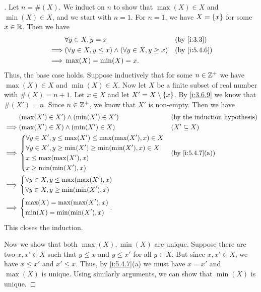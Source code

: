 \begin{proof}[]
  Let \(n = \#(X)\).
  We induct on \(n\) to show that \(\max(X) \in X\) and \(\min(X) \in X\), and we start with \(n = 1\).
  For \(n = 1\), we have \(X = \left\lbrace x\right\rbrace\) for some \(x \in \mathbb{R}\).
  Then we have
  \begin{align*}
             & \forall y \in X, y = x                                        &  & \by{i:3.3}   \\
    \implies & (\forall y \in X, y \leq x) \land (\forall y \in X, y \geq x) &  & \by{i:5.4.6} \\
    \implies & \max(X) = \min(X) = x.
  \end{align*}
  Thus, the base case holds.
  Suppose inductively that for some \(n \in \mathbb{Z}^+\) we have \(\max(X) \in X\) and \(\min(X) \in X\).
  Now let \(X\) be a finite subset of real number with \(\#(X) = n + 1\).
  Let \(x \in X\) and let \(X' = X \setminus \left\lbrace x\right\rbrace\).
  By \cref{i:3.6.9} we know that \(\#(X') = n\).
  Since \(n \in \mathbb{Z}^+\), we know that \(X'\) is non-empty.
  Then we have
  \begin{align*}
             & (\max(X') \in X') \land (\min(X') \in X')                         &  & \byIH            \\
    \implies & (\max(X') \in X) \land (\min(X') \in X)                           &  & (X' \subseteq X) \\
    \implies & \begin{dcases}
                 \forall y \in X', y \leq \max(X') \leq \max(\max(X'), x) \in X \\
                 \forall y \in X', y \geq \min(X') \geq \min(\min(X'), x) \in X \\
                 x \leq \max(\max(X'), x)                                       \\
                 x \geq \min(\min(X'), x)
               \end{dcases} &  & \by{i:5.4.7}[a]                          \\
    \implies & \begin{dcases}
                 \forall y \in X, y \leq \max(\max(X'), x) \\
                 \forall y \in X, y \geq \min(\min(X'), x)
               \end{dcases}                                               \\
    \implies & \begin{dcases}
                 \max(X) = \max(\max(X'), x) \\
                 \min(X) = \min(\min(X'), x)
               \end{dcases}.
  \end{align*}
  This closes the induction.

  Now we show that both \(\max(X), \min(X)\) are unique.
  Suppose there are two \(x, x' \in X\) such that \(y \leq x\) and \(y \leq x'\) for all \(y \in X\).
  But since \(x, x' \in X\), we have \(x \leq x'\) and \(x' \leq x\).
  Thus, by \cref{i:5.4.7}(a) we must have \(x = x'\) and \(\max(X)\) is unique.
  Using similarly arguments, we can show that \(\min(X)\) is unique.
\end{proof}

